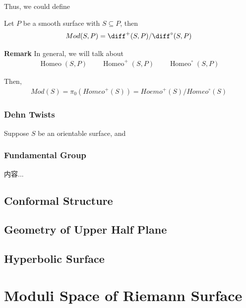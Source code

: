\documentclass[Total.tex]{subfiles}
\begin{document}
			Thus, we could define
			\begin{Def}
				Let $P$ be a smooth surface with $S\subseteq P$, then
				\begin{gather*}
					Mod(S,P)=\diff^+(S,P)/\diff^\circ(S,P)
				\end{gather*}
			\end{Def}
			
			\textbf{Remark} In general, we will talk about 
			\begin{gather*}
				\operatorname{Homeo}(S,P)\qquad 
				\operatorname{Homeo}^+(S,P)\qquad 
				\operatorname{Homeo}^\circ(S,P)
			\end{gather*}
			
			Then,
			\begin{gather*}
				Mod(S)=\pi_0(Homeo^+(S))=Hoemo^+(S)/Homeo^\circ(S)
			\end{gather*}
			
			\subsection{Dehn Twists}
			\begin{Def}
				Suppose $S$ be an orientable surface, and 
			\end{Def}
			
			
			\subsection{Fundamental Group}
			
			\begin{Def}
				内容...
			\end{Def}
			
		\section{Conformal Structure}
		
		\section{Geometry of Upper Half Plane}
		
		\section{Hyperbolic Surface}
	\chapter{Moduli Space of Riemann Surface}
\end{document}
